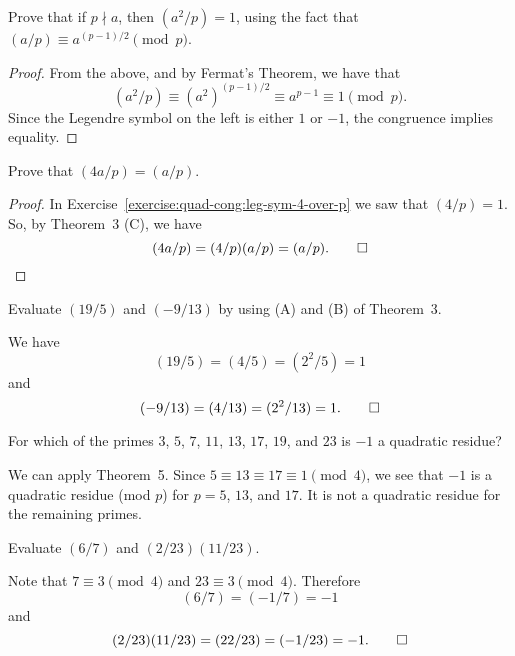  Prove that if $p\nmid a$, then $(a^2/p) = 1$, using the
fact that $(a/p)\equiv a^{(p-1)/2}\pmod{p}$.
\begin{proof}
  From the above, and by Fermat's Theorem, we have that
  \begin{equation*}
    (a^2/p) \equiv (a^2)^{(p-1)/2} \equiv a^{p-1} \equiv 1\pmod{p}.
  \end{equation*}
  Since the Legendre symbol on the left is either $1$ or $-1$, the
  congruence implies equality.
\end{proof}

 Prove that $(4a/p) = (a/p)$.
\begin{proof}
  In Exercise~\ref{exercise:quad-cong:leg-sym-4-over-p} we saw that
  $(4/p) = 1$. So, by Theorem~3 (C), we have
  \begin{equation*}
    (4a/p) = (4/p)(a/p) = (a/p). \qedhere
  \end{equation*}
\end{proof}

 Evaluate $(19/5)$ and $(-9/13)$ by using (A) and (B) of
Theorem~3.
\begin{solution}
  We have
  \begin{equation*}
    (19/5) = (4/5) = (2^2/5) = 1
  \end{equation*}
  and
  \begin{equation*}
    (-9/13) = (4/13) = (2^2/13) = 1. \qedhere
  \end{equation*}
\end{solution}

 For which of the primes $3$, $5$, $7$, $11$, $13$, $17$,
$19$, and $23$ is $-1$ a quadratic residue?
\begin{solution}
  We can apply Theorem~5. Since $5\equiv13\equiv17\equiv1\pmod{4}$, we
  see that $-1$ is a quadratic residue (mod $p$) for $p = 5$, $13$,
  and $17$. It is not a quadratic residue for the remaining primes.
\end{solution}

 Evaluate $(6/7)$ and $(2/23)(11/23)$.
\begin{solution}
  Note that $7\equiv3\pmod4$ and $23\equiv3\pmod4$. Therefore
  \begin{equation*}
    (6/7) = (-1/7) = -1
  \end{equation*}
  and
  \begin{equation*}
    (2/23)(11/23) = (22/23) = (-1/23) = -1. \qedhere
  \end{equation*}
\end{solution}

